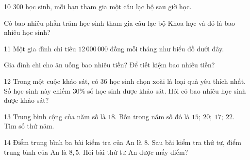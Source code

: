 \gap
\needspace{7.5cm}
\begin{probbox}{10}{\relax}
$300$ học sinh, mỗi bạn tham gia một câu lạc bộ sau giờ học.
\begin{center}
\end{center}
Có bao nhiêu phần trăm học sinh tham gia câu lạc bộ Khoa học và đó là bao nhiêu học sinh?
\end{probbox}
\gap
\needspace{7.5cm}
\begin{probbox}{11}{\relax}
Một gia đình chi tiêu $12\,000\,000$ đồng mỗi tháng như biểu đồ dưới đây.
\begin{center}
\end{center}
Gia đình chi cho ăn uống bao nhiêu tiền? Để tiết kiệm bao nhiêu tiền?
\end{probbox}
\gap
\begin{probbox}{12}{\relax}
Trong một cuộc khảo sát, có $36$ học sinh chọn xoài là loại quả yêu thích nhất. Số học sinh này chiếm $30\%$ số học sinh được khảo sát. Hỏi có bao nhiêu học sinh được khảo sát?
\end{probbox}
\gap
\begin{probbox}{13}{\relax}
Trung bình cộng của năm số là $18$. Bốn trong năm số đó là $15;\ 20;\ 17;\ 22$. Tìm số thứ năm.
\end{probbox}
\gap
\begin{probbox}{14}{\relax}
Điểm trung bình ba bài kiểm tra của An là $8$. Sau bài kiểm tra thứ tư, điểm trung bình của An là $8{,}5$. Hỏi bài thứ tư An được mấy điểm?
\end{probbox}
